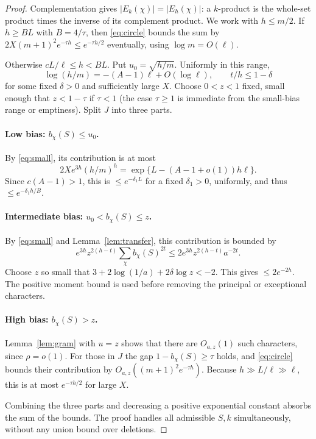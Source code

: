 \documentclass[11pt]{article}
\theoremstyle{remark}\newtheorem{remark}[theorem]{Remark}
\begin{document}
\begin{proof}
Complementation gives $|E_k(\chi)|=|E_h(\chi)|$: a $k$-product is the whole-set product times the inverse of its complement product. We work with $h\le m/2$. If $h\ge BL$ with $B=4/\tau$, then \eqref{eq:circle} bounds the sum by $2X(m+1)^2e^{-\tau h}\le e^{-\tau h/2}$ eventually, using $\log m=O(\ell)$.

Otherwise $c L/\ell\le h<BL$. Put $u_0=\sqrt{h/m}$. Uniformly in this range,
\[
 \log(h/m)=-(A-1)\ell+O(\log\ell),\qquad t/h\le1-\delta
\]
for some fixed $\delta>0$ and sufficiently large $X$. Choose $0<z<1$ fixed, small enough that $z<1-\tau$ if $\tau<1$ (the case $\tau\ge1$ is immediate from the small-bias range or emptiness). Split $J$ into three parts.

\paragraph{Low bias: $b_\chi(S)\le u_0$.} By \eqref{eq:small}, its contribution is at most
\[
 2X e^{3h}(h/m)^h
 =\exp\{L-(A-1+o(1))h\ell\}.
\]
Since $c(A-1)>1$, this is $\le e^{-\delta_1 L}$ for a fixed $\delta_1>0$, uniformly, and thus $\le e^{-\delta_1 h/B}$.

\paragraph{Intermediate bias: $u_0<b_\chi(S)\le z$.} By \eqref{eq:small} and Lemma~\ref{lem:transfer}, this contribution is bounded by
\[
 e^{3h} z^{2(h-t)} \sum_\chi b_\chi(S)^{2t}
 \le 2e^{3h}z^{2(h-t)}a^{-2t}.
\]
Choose $z$ so small that $3+2\log(1/a)+2\delta\log z<-2$. This gives $\le2e^{-2h}$. The positive moment bound is used before removing the principal or exceptional characters.

\paragraph{High bias: $b_\chi(S)>z$.} Lemma~\ref{lem:gram} with $u=z$ shows that there are $O_{a,z}(1)$ such characters, since $\rho=o(1)$. For those in $J$ the gap $1-b_\chi(S)\ge\tau$ holds, and \eqref{eq:circle} bounds their contribution by $O_{a,z}((m+1)^2e^{-\tau h})$. Because $h\gg L/\ell\gg\ell$, this is at most $e^{-\tau h/2}$ for large $X$.

Combining the three parts and decreasing a positive exponential constant absorbs the sum of the bounds. The proof handles all admissible $S,k$ simultaneously, without any union bound over deletions.
\end{proof}
\end{document}

